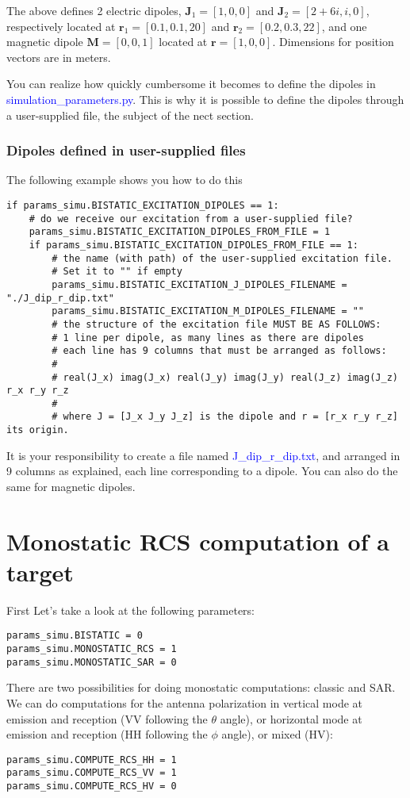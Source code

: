 \documentclass[a4paper,10pt]{book}
\newcommand{\file}[1] {\textcolor{blue}{\textsf{#1}}}
\begin{document}
The above defines 2 electric dipoles, $\mathbf{J}_1 = [1, 0, 0]$ and $\mathbf{J}_2 = [2+6i, i, 0]$, respectively located at $\mathbf{r}_1 = [0.1, 0.1, 20]$ and $\mathbf{r}_2 = [0.2, 0.3, 22]$, and one magnetic dipole $\mathbf{M} = [0, 0, 1]$ located at $\mathbf{r} = [1, 0, 0]$. Dimensions for position vectors are in meters.
%
\par
You can realize how quickly cumbersome it becomes to define the dipoles in \file{simulation\_parameters.py}. This is why it is possible to define the dipoles through a user-supplied file, the subject of the nect section.

\subsubsection{Dipoles defined in user-supplied files}
%
\par
The following example shows you how to do this
\begin{verbatim}
if params_simu.BISTATIC_EXCITATION_DIPOLES == 1:
    # do we receive our excitation from a user-supplied file?
    params_simu.BISTATIC_EXCITATION_DIPOLES_FROM_FILE = 1
    if params_simu.BISTATIC_EXCITATION_DIPOLES_FROM_FILE == 1:
        # the name (with path) of the user-supplied excitation file. 
        # Set it to "" if empty
        params_simu.BISTATIC_EXCITATION_J_DIPOLES_FILENAME = "./J_dip_r_dip.txt"
        params_simu.BISTATIC_EXCITATION_M_DIPOLES_FILENAME = ""
        # the structure of the excitation file MUST BE AS FOLLOWS:
        # 1 line per dipole, as many lines as there are dipoles
        # each line has 9 columns that must be arranged as follows:
        #
        # real(J_x) imag(J_x) real(J_y) imag(J_y) real(J_z) imag(J_z) r_x r_y r_z
        #
        # where J = [J_x J_y J_z] is the dipole and r = [r_x r_y r_z] its origin.
\end{verbatim}
It is your responsibility to create a file named \file{J\_dip\_r\_dip.txt}, and arranged in 9 columns as explained, each line corresponding to a dipole. You can also do the same for magnetic dipoles.


\section{Monostatic RCS computation of a target}
%
\par
First Let's take a look at the following parameters:
\begin{verbatim}
params_simu.BISTATIC = 0
params_simu.MONOSTATIC_RCS = 1
params_simu.MONOSTATIC_SAR = 0
\end{verbatim}
There are two possibilities for doing monostatic computations: classic and SAR. We can do computations for the antenna polarization in vertical mode at emission and reception (VV following the $\theta$ angle), or horizontal mode at emission and reception (HH following the $\phi$ angle), or mixed (HV):
\begin{verbatim}
params_simu.COMPUTE_RCS_HH = 1
params_simu.COMPUTE_RCS_VV = 1
params_simu.COMPUTE_RCS_HV = 0
\end{verbatim}
\end{document}
